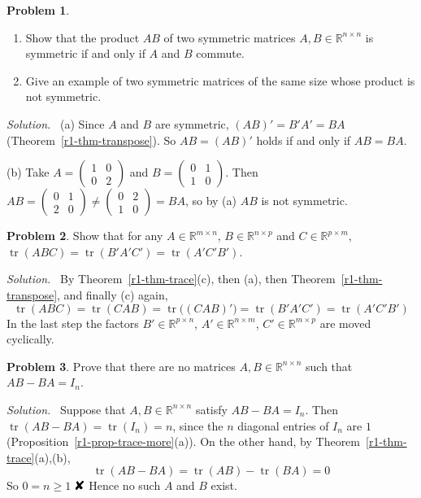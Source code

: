 \documentclass[12pt]{article}
\newcommand{\R}{\mathbb R}
\newcommand{\contradiction}{\mathord{\text{\large\ding{56}}}}
\DeclareMathOperator{\tr}{tr}
\theoremstyle{definition}
\newtheorem{problem}{Problem}
\newenvironment{solution}{\par\noindent\textit{Solution.}\ }{\par\smallskip}
\begin{document}
\begin{problem}\label{r1-ex-symmetric-product}
\begin{enumerate}
\item Show that the product \(AB\) of two symmetric matrices \(A,B\in\R^{n\times n}\) is
symmetric if and only if \(A\) and \(B\) commute.
\item Give an example of two symmetric matrices of the same size whose product is not
symmetric.
\end{enumerate}
\end{problem}
\begin{solution}
(a) Since \(A\) and \(B\) are symmetric, \((AB)'=B'A'=BA\)
(Theorem~\ref{r1-thm-transpose}). So \(AB=(AB)'\) holds if and only if \(AB=BA\).

(b) Take \(A=\left(\begin{smallmatrix}1&0\\0&2\end{smallmatrix}\right)\) and
\(B=\left(\begin{smallmatrix}0&1\\1&0\end{smallmatrix}\right)\). Then
\(AB=\left(\begin{smallmatrix}0&1\\2&0\end{smallmatrix}\right)\ne\left(\begin{smallmatrix}0&2\\1&0\end{smallmatrix}\right)=BA\),
so by (a) \(AB\) is not symmetric.
\end{solution}

\begin{problem}\label{r1-ex-trace-transposes}
Show that for any \(A\in\R^{m\times n}\), \(B\in\R^{n\times p}\) and \(C\in\R^{p\times m}\),
\(\tr(ABC)=\tr(B'A'C')=\tr(A'C'B')\).
\end{problem}
\begin{solution}
By Theorem~\ref{r1-thm-trace}(c), then (a), then Theorem~\ref{r1-thm-transpose}, and finally
(c) again,
\[
\tr(ABC)=\tr(CAB)=\tr\bigl((CAB)'\bigr)=\tr(B'A'C')=\tr(A'C'B')
\]
In the last step the factors \(B'\in\R^{p\times n}\), \(A'\in\R^{n\times m}\),
\(C'\in\R^{m\times p}\) are moved cyclically.
\end{solution}

\begin{problem}\label{r1-pr-commutator}
Prove that there are no matrices \(A,B\in\R^{n\times n}\) such that \(AB-BA=I_n\).
\end{problem}
\begin{solution}
Suppose that \(A,B\in\R^{n\times n}\) satisfy \(AB-BA=I_n\). Then \(\tr(AB-BA)=\tr(I_n)=n\), since the \(n\)
diagonal entries of \(I_n\) are \(1\) (Proposition~\ref{r1-prop-trace-more}(a)). On the other hand, by
Theorem~\ref{r1-thm-trace}(a),(b),
\[
\tr(AB-BA)=\tr(AB)-\tr(BA)=0
\]
So \(0=n\geqslant1\) \(\contradiction\) Hence no such \(A\) and \(B\) exist.
\end{solution}
\end{document}
